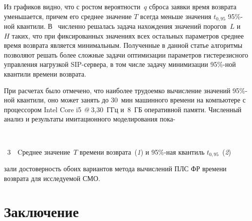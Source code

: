 \begin{multicols}{2}
Из графиков видно, что с ростом вероятности~$q$ сброса заявки время
возврата уменьшается, причем его среднее значение $T$ всегда меньше
значения $t_{0{,}95}$ 95\%-ной квантили. В~\cite{8-pe} численно решалась
задача нахождения значений порогов~$L$ и~$H$ таких, что при
фиксированных значениях всех остальных параметров среднее время
возврата является минимальным. Полученные в данной статье алгоритмы
позволяют решать более сложные задачи оптимизации параметров
гистерезисного управления нагрузкой SIP-сервера, в том числе задачу
минимизации 95\%-ной квантили времени возврата.

При расчетах было отмечено, что наиболее трудоемко вычисление
значений 95\%-ной квантили, оно может занять до 30~мин машинного
времени на компьютере с процессором Intel Core i5 {\it @} 3,30~ГГц
и~8~ГБ оперативной памяти. Численный анализ
 и результаты имитационного
моделирования пока-\linebreak\vspace*{-12pt}

\pagebreak

\begin{center}  %
\vspace*{-3pt}
\mbox{%
 \epsfxsize=72.321mm
 }
 \end{center}
 
 
\noindent
{{\figurename~3}\ \ \small{Cреднее
значение~$T$ времени возврата~(\textit{1}) и 95\%-ная квантиль $t_{0{,}95}$~(\textit{2})}}
 

\vspace*{12pt}

\addtocounter{figure}{1}


\noindent 
зали достоверность обоих вариантов метода
вы\-чис\-ле\-ний ПЛС ФР времени возврата для исследуемой СМО.

\vspace*{-6pt}

\section{Заключение}

\vspace*{-2pt}



\end{multicols}

